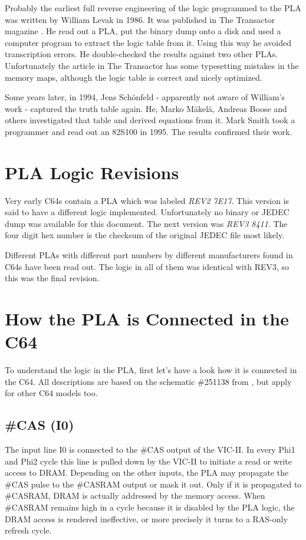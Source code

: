 Probably the earliest full reverse engineering of the logic programmed to
the PLA was written by William Levak in 1986. It was published in The
Transactor magazine \cite{Lev86}. He read out a PLA, put the binary dump
onto a disk and used a computer program to extract the logic table from it.
Using this way he avoided transcription errors. He double-checked the results
against two other PLAs. Unfortunately the article in The Transactor has
some typesetting mistakes in the memory maps, although the logic table is
correct and nicely optimized.

Some years later, in 1994, Jens Schönfeld - apparently not aware of William's
work - captured the truth table again. He, Marko Mäkelä, Andreas Boose and
others \cite{PLA95} investigated that table and derived equations from
it. Mark Smith took a programmer and read out an 82S100 in 1995. The results
confirmed their work.

\section{PLA Logic Revisions}

Very early C64s contain a PLA which was labeled \textit{REV2 7E17}. This
version is said to have a different logic implemented. Unfortunately no
binary or JEDEC dump was available for this document. The next version was
\textit {REV3 8411}. The four digit hex number is the checksum of the
original JEDEC file most likely.

Different PLAs with different part numbers by different manufacturers found
in C64s have been read out. The logic in all of them was identical
with REV3, so this was the final revision.

\section{How the PLA is Connected in the C64} \label{sec:connection}

To understand the logic in the PLA, first let's have a look how it is
connected in the C64. All descriptions are based on the schematic \#251138 from
\cite{Serv85}, but apply for other C64 models too.

\subsection{\#CAS (I0)}

The input line I0 is connected to the \#CAS output of the VIC-II. In every
Phi1 and Phi2 cycle this line is pulled down by the VIC-II to initiate a
read or write access to DRAM. Depending on the other inputs, the PLA may
propagate the \#CAS pulse to the \#CASRAM output or mask it out. Only if it
is propagated to \#CASRAM, DRAM is actually addressed by the memory access.
When \#CASRAM remains high in a cycle because it is disabled by the PLA
logic, the DRAM access is rendered ineffective, or more precisely it turns
to a RAS-only refresh cycle.

